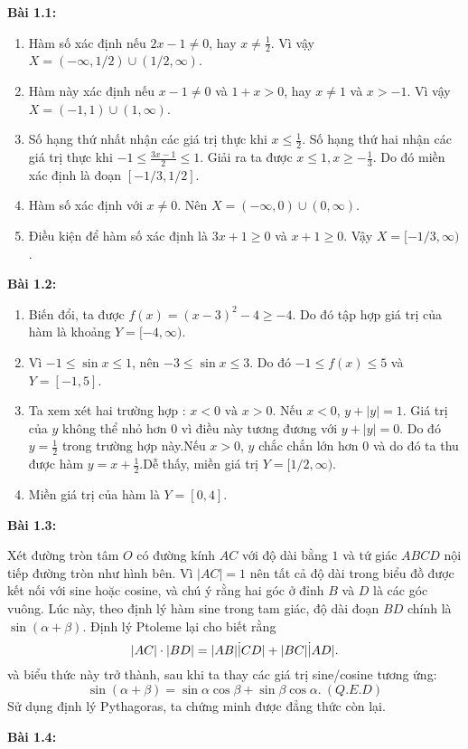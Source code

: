 \textbf{Bài 1.1:}
\begin{enumerate}[label=(\alph*)]
    \item Hàm số xác định nếu \(2x-1\neq 0\), hay \(x\neq \frac{1}{2}\). Vì vậy \(X=(-\infty, 1/2)\cup (1/2,\infty)\).
    \item Hàm này xác định nếu \(x-1\neq 0\) và \(1+x>0\), hay \(x\neq 1\) và \(x>-1\). Vì vậy \(X=(-1,1)\cup (1,\infty)\).
    \item Số hạng thứ nhất nhận các giá trị thực khi \(x\leq\frac{1}{2}\). Số hạng thứ hai nhận các giá trị thực khi \(-1\leq\frac{3x-1}{2}\leq 1.\) Giải ra ta được \(x\leq 1, x\geq -\frac{1}{3}\). Do đó miền xác định là đoạn \([-1/3,1/2]\).
    \item Hàm số xác định với \(x\neq 0\). Nên \(X=(-\infty, 0)\cup(0,\infty)\).
    \item Điều kiện để hàm số xác định là \(3x+1\geq 0\) và \(x+1\geq 0\). Vậy \(X=[-1/3,\infty)\).
\end{enumerate}
\vspace{5pt}

\textbf{Bài 1.2:}
\begin{enumerate}[label=(\alph*)]
    \item Biến đổi, ta được \(f(x)=(x-3)^2 -4 \geq -4\). Do đó tập hợp giá trị của hàm là khoảng \(Y=[-4, \infty)\).
    \item Vì \(-1\leq \sin x\leq 1\), nên \(-3\leq\sin x\leq 3\). Do đó \(-1\leq f(x)\leq 5\) và \(Y=[-1, 5]\).
    \item Ta xem xét hai trường hợp : \(x<0 \text{ và } x>0\). \newline Nếu \(x<0\), \(y+\lvert y\rvert =1\). Giá trị của \(y\) không thể nhỏ hơn \(0\) vì điều này tương đương với \(y+\lvert y\rvert =0\). Do đó \(y=\frac{1}{2}\) trong trường hợp này.\newline Nếu \(x>0\), \(y\) chắc chắn lớn hơn \(0\) và do đó ta thu được hàm \(y=x+\frac{1}{2}\).\newline Dễ thấy, miền giá trị \(Y=[1/2,\infty)\).
    \item Miền giá trị của hàm là \(Y=[0,4]\).
\end{enumerate}
\vspace{5pt}

\textbf{Bài 1.3:}

Xét đường tròn tâm \(O\) có đường kính \(AC\) với độ dài bằng \(1\) và tứ giác \(ABCD\) nội tiếp đường tròn như hình bên.\newline
Vì \(\lvert AC\rvert =1\) nên tất cả độ dài trong biểu đồ được kết nối với sine hoặc cosine, và chú ý rằng hai góc ở đỉnh \(B\) và \(D\) là các góc vuông.\newline
Lúc này, theo định lý hàm sine trong tam giác, độ dài đoạn \(BD\) chính là \(\sin(\alpha+\beta)\). Định lý Ptoleme lại cho biết rằng \[\lvert AC\rvert \cdot\lvert BD\rvert =\lvert AB\rvert\dot\lvert CD\rvert +\lvert BC\rvert\dot\lvert AD\rvert.\]
và biểu thức này trở thành, sau khi ta thay các giá trị sine/cosine tương ứng:\[\sin(\alpha+\beta)=\sin\alpha\cos\beta +\sin\beta\cos\alpha.~(Q.E.D)\]
Sử dụng định lý Pythagoras, ta chứng minh được đẳng thức còn lại.

\vspace{5pt}
\textbf{Bài 1.4:}
